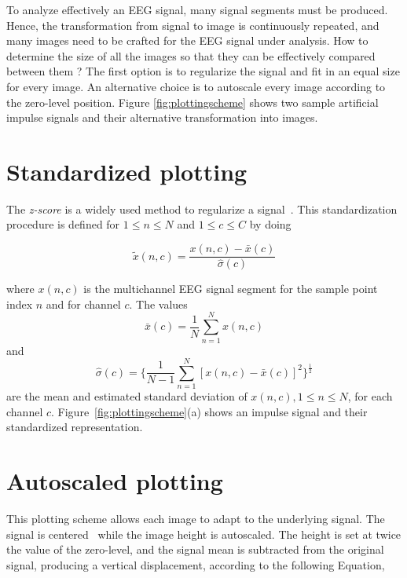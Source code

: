 To analyze effectively an EEG signal, many signal segments must be produced.  Hence, the transformation from signal to image is continuously repeated, and many images need to be crafted for the EEG signal under analysis.  How to determine the size of all the images so that they can be effectively compared between them ?  The first option is to regularize the signal and fit in an equal size for every image.  An alternative choice is to autoscale every image according to the zero-level position.  Figure \ref{fig:plottingscheme} shows two sample artificial impulse signals and their  alternative transformation into images.

\section{Standardized plotting}
\label{standardized}

The \textit{z-score} is a widely used method to regularize a signal~\cite{VandenBerg2006,Zhang2013}. This standardization procedure is defined for  $1 \leq n \leq N$ and $1 \leq c \leq C$ by doing

\begin{equation}
\tilde{x}(n,c) =  \frac{ x(n,c) - \bar{x}(c) }{ \hat{\sigma}(c) } 
\label{eq:standarizedaverages}
\end{equation}

\noindent  where $ x(n,c) $ is the multichannel EEG signal segment for the sample point index $n$ and for channel $c$. The values $$\bar{x}(c) =\frac{1}{N}\sum_{n=1}^{N}x(n,c)$$ and $$ \hat{\sigma}(c) =   \bigg \{ \frac{1}{N-1}\sum_{n=1}^{N} { \left[ x(n,c)-\bar{x}(c) \right]  }^2 \bigg \}^{\frac{1}{2}}$$ are the mean and estimated standard deviation of $x(n,c), 1 \leq n \leq N$, for each channel $c$. Figure~\ref{fig:plottingscheme}(a) shows an impulse signal and their standardized representation.

\section{Autoscaled plotting}
\label{autoscaled}

This plotting scheme allows each image to adapt to the underlying signal.  The signal is centered~\cite{VandenBerg2006} while the image height is autoscaled. The height is set at twice the value of the zero-level, and the signal mean is subtracted from the original signal, producing a vertical displacement, according to the following Equation,

